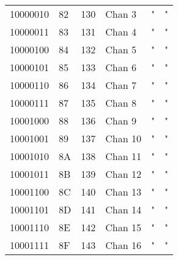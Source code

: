 \begin{center}
\begin{supertabular}{| C{2cm} | C{1.5cm} | C{1.5cm} | C{5.3cm} | C{1.5cm} | C{1.5cm} |}
             10000010 & 82 & 130 & Chan 3   &                   "                    &                    "                       \\
                10000011 & 83 & 131 & Chan 4   &                   "                    &                    "                       \\
             10000100 & 84 & 132 & Chan 5   &                   "                    &                    "                       \\
                10000101 & 85 & 133 & Chan 6   &                   "                    &                    "                       \\
             10000110 & 86 & 134 & Chan 7   &                   "                    &                    "                       \\
                10000111 & 87 & 135 & Chan 8   &                   "                    &                    "                       \\
             10001000 & 88 & 136 & Chan 9   &                   "                    &                    "                       \\
                10001001 & 89 & 137 & Chan 10  &                   "                    &                    "                       \\
             10001010 & 8A & 138 & Chan 11  &                   "                    &                    "                       \\
                10001011 & 8B & 139 & Chan 12  &                   "                    &                    "                       \\
             10001100 & 8C & 140 & Chan 13  &                   "                    &                    "                       \\
                10001101 & 8D & 141 & Chan 14  &                   "                    &                    "                       \\
             10001110 & 8E & 142 & Chan 15  &                   "                    &                    "                       \\
                10001111 & 8F & 143 & Chan 16  &                   "                    &                    "                       \\
        \end{supertabular}
        \end{center}

